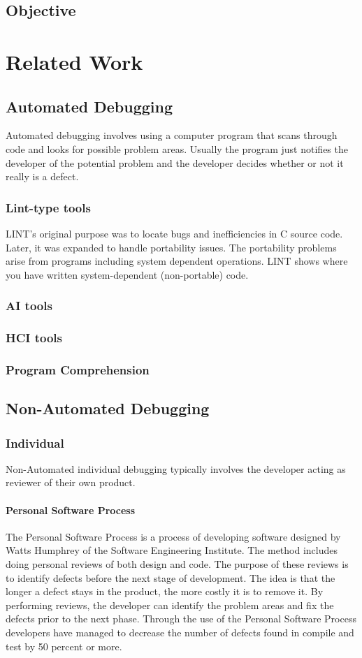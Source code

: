 \section{Objective}


\chapter{Related Work}
\section{Automated Debugging}
Automated debugging involves using a computer program that scans through
code and looks for possible problem areas. Usually the program just
notifies the developer of the potential problem and the developer decides
whether or not it really is a defect.
\subsection{Lint-type tools}
LINT's original purpose was to locate bugs and inefficiencies in C source
code.  Later, it was expanded to handle portability issues.  The
portability problems arise from programs including system dependent
operations.  LINT shows where you have written system-dependent
(non-portable) code.
\subsection{AI tools}
\subsection{HCI tools}
\subsection{Program Comprehension}
\section{Non-Automated Debugging}
\subsection{Individual}
Non-Automated individual debugging typically involves the developer acting
as reviewer of their own product.
\subsubsection{Personal Software Process}
The Personal Software Process is a process of developing software designed
by Watts Humphrey of the Software Engineering Institute.  The method
includes doing personal reviews of both design and code.  The purpose of
these reviews is to identify defects before the next stage of development.
The idea is that the longer a defect stays in the product, the more costly
it is to remove it.  By performing reviews, the developer can identify the
problem areas and fix the defects prior to the next phase.  Through the use
of the Personal Software Process developers have managed to decrease the
number of defects found in compile and test by 50 percent or more.
